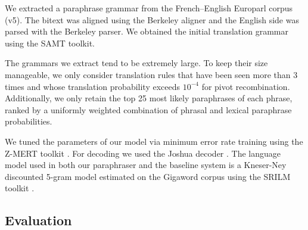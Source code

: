 \documentclass[11pt]{article}
\begin{document}
We extracted a paraphrase grammar from the French--English Europarl
corpus (v5). The bitext was aligned using the Berkeley aligner and the
English side was parsed with the Berkeley parser. We obtained the
initial translation grammar using the SAMT toolkit.

The grammars we extract tend to be extremely large. To keep their
size manageable, we only consider translation rules that have been
seen more than 3 times and whose translation probability exceeds
$10^{-4}$ for pivot recombination. Additionally, we only retain the
top 25 most likely paraphrases of each phrase, ranked by a uniformly
weighted combination of phrasal and lexical paraphrase probabilities.

We tuned the parameters of our model via minimum error rate training
using the Z-MERT toolkit \cite{Zaidan2009}. For decoding we used the
Joshua decoder \cite{Joshua-2.0}. The language model used in both our
paraphraser and the  baseline system is a
Kneser-Ney discounted 5-gram model estimated on the Gigaword corpus
using the SRILM toolkit \cite{SRILM}.



\subsection{Evaluation} \label{evaluation}
\end{document}
